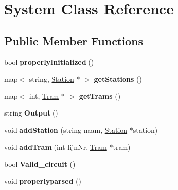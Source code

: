 \hypertarget{classSystem}{}\section{System Class Reference}
\label{classSystem}
\subsection*{Public Member Functions}
\begin{DoxyCompactItemize}
\item 
bool {\bfseries properly\+Initialized} ()\hypertarget{classSystem_a8532240d722aafc7084ca6047909c8da}{}\label{classSystem_a8532240d722aafc7084ca6047909c8da}

\item 
map$<$ string, \hyperlink{classStation}{Station} $\ast$ $>$ {\bfseries get\+Stations} ()\hypertarget{classSystem_a30d05f13a13f95f580a0e705142fa3ea}{}\label{classSystem_a30d05f13a13f95f580a0e705142fa3ea}

\item 
map$<$ int, \hyperlink{classTram}{Tram} $\ast$ $>$ {\bfseries get\+Trams} ()\hypertarget{classSystem_a504f671b35f459b2d901aee73a2855c7}{}\label{classSystem_a504f671b35f459b2d901aee73a2855c7}

\item 
string {\bfseries Output} ()\hypertarget{classSystem_afd117849fbf4d7d8dc0f54988589c249}{}\label{classSystem_afd117849fbf4d7d8dc0f54988589c249}

\item 
void {\bfseries add\+Station} (string naam, \hyperlink{classStation}{Station} $\ast$station)\hypertarget{classSystem_a8d73a59e5ca0c23cc36d3bf4b7ac902d}{}\label{classSystem_a8d73a59e5ca0c23cc36d3bf4b7ac902d}

\item 
void {\bfseries add\+Tram} (int lijn\+Nr, \hyperlink{classTram}{Tram} $\ast$tram)\hypertarget{classSystem_a9c6d16ae38e21499491a7059d67f9284}{}\label{classSystem_a9c6d16ae38e21499491a7059d67f9284}

\item 
bool {\bfseries Valid\+\_\+circuit} ()\hypertarget{classSystem_aca8e2da325015db5a6d1c5f908aa6d4b}{}\label{classSystem_aca8e2da325015db5a6d1c5f908aa6d4b}

\item 
void {\bfseries properlyparsed} ()\hypertarget{classSystem_a8060d45e6030ee1ad01a11a990bdd1ad}{}\label{classSystem_a8060d45e6030ee1ad01a11a990bdd1ad}


\end{DoxyCompactItemize}
